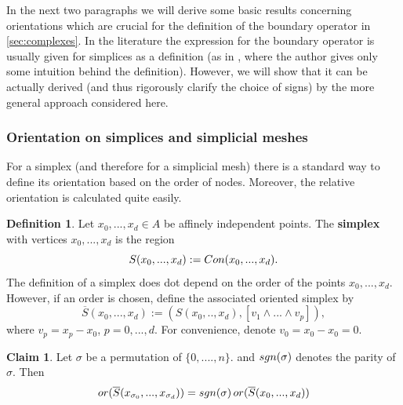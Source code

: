 \documentclass{elsarticle}
\theoremstyle{definition}
\newtheorem{claim}[theorem]{Claim}
\newtheorem{definition}[theorem]{Definition}
\newcommand{\Con}{\mathop{\rm Con}\nolimits} %
\newcommand{\sgn}{\mathop{\rm sgn}\nolimits}   %
\newcommand{\OR}{\mathop{\rm or}\nolimits}   %
\begin{document}
In the next two paragraphs we will derive some basic results concerning orientations which are crucial for the definition of the boundary operator in \ref{sec:complexes}. In the literature the expression for the boundary operator is usually given for simplices as a definition (as in \cite[Section 2.1]{hatcher2002topology}, where the author gives only some intuition behind the definition). However, we will show that it can be actually derived (and thus rigorously clarify the choice of signs) by the more general approach considered here.

\subsubsection{Orientation on simplices and simplicial meshes}
\label{sec:simplex}
For a simplex (and therefore for a simplicial mesh) there is a standard way to define its orientation based on the order of nodes. Moreover, the relative orientation is calculated quite easily.
\begin{definition}
  Let $x_0, ..., x_d \in A$ be affinely independent points. The \textbf{simplex} with vertices $x_0, ..., x_d$ is the region
  \begin{equation*}
    S(x_0, ..., x_d) := \Con(x_0, ..., x_d).
  \end{equation*}
  The definition of a simplex does dot depend on the order of the points $x_0, ..., x_d$. However, if an order is chosen, define the associated oriented simplex by
  \begin{equation*}
    \overline{S}(x_0, ..., x_d) := (S(x_0, .., x_d), [v_1 \wedge ... \wedge v_p]),
  \end{equation*}
  where $v_p = x_p - x_0$, $p = 0,..., d$. For convenience, denote $v_0 = x_0 - x_0 = 0$.
\end{definition}
\begin{claim}
  Let $\sigma$ be a permutation of $\{0, ...., n\}$. and $\sgn(\sigma)$ denotes the parity of $\sigma$. Then
  \begin{equation}
    \OR(\overline{S}(x_{\sigma_0}, ..., x_{\sigma_d})) =
    \sgn(\sigma) \OR(\overline{S}(x_{0}, ..., x_{d})) 
  \end{equation}
\end{claim}
\end{document}
